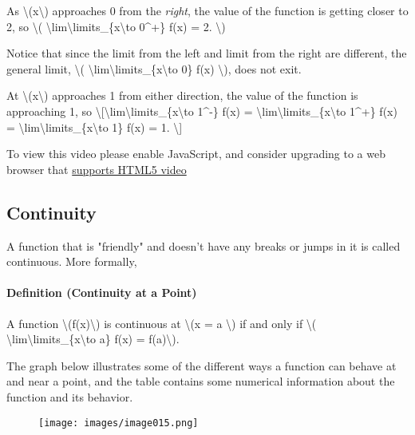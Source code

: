 As \textbackslash{}(x\textbackslash{}) approaches 0 from the
\emph{right}, the value of the function is getting closer to 2, so
\textbackslash{}(
\textbackslash{}lim\textbackslash{}limits\_\{x\textbackslash{}to
0\^{}+\} f(x) = 2. \textbackslash{})

Notice that since the limit from the left and limit from the right are
different, the general limit, \textbackslash{}(
\textbackslash{}lim\textbackslash{}limits\_\{x\textbackslash{}to 0\}
f(x) \textbackslash{}), does not exit.

At \textbackslash{}(x\textbackslash{}) approaches 1 from either
direction, the value of the function is approaching 1, so
\textbackslash{}{[}\textbackslash{}lim\textbackslash{}limits\_\{x\textbackslash{}to
1\^{}-\} f(x) =
\textbackslash{}lim\textbackslash{}limits\_\{x\textbackslash{}to
1\^{}+\} f(x) =
\textbackslash{}lim\textbackslash{}limits\_\{x\textbackslash{}to 1\}
f(x) = 1. \textbackslash{}{]}

To view this video please enable JavaScript, and consider upgrading to a
web browser that \href{http://videojs.com/html5-video-support/}{supports
HTML5 video}

\hypertarget{continuity}{%
\subsection{Continuity}\label{continuity}}

A function that is "friendly" and doesn't have any breaks or jumps in it
is called continuous. More formally,

\hypertarget{definition-continuity-at-a-point}{%
\paragraph{Definition (Continuity at a
Point)}\label{definition-continuity-at-a-point}}

A function \textbackslash{}(f(x)\textbackslash{}) is continuous at
\textbackslash{}(x = a \textbackslash{}) if and only if
\textbackslash{}(
\textbackslash{}lim\textbackslash{}limits\_\{x\textbackslash{}to a\}
f(x) = f(a)\textbackslash{}).

The graph below illustrates some of the different ways a function can
behave at and near a point, and the table contains some numerical
information about the function and its behavior.

\begin{figure}
\centering
\texttt{[image: images/image015.png]}
\caption{}
\end{figure}


